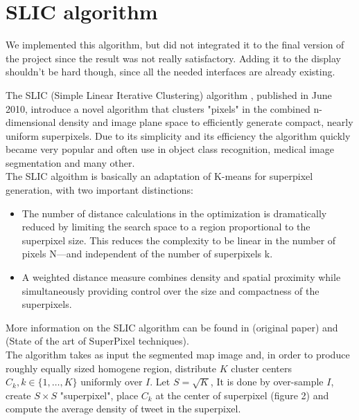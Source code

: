\section{ SLIC algorithm}
\label{sec:K-M_clustering}

We implemented this algorithm, but did not integrated it to the final version of the project since the result was not really satisfactory. Adding it to the display shouldn't be hard though, since all the needed interfaces are already existing. 

The SLIC (Simple Linear Iterative Clustering)  algorithm \cite{SLIC1}, published in June 2010, introduce a novel algorithm that clusters "pixels" in the combined n-dimensional density and image plane space to efficiently generate compact, nearly uniform superpixels. Due to its simplicity and its efficiency the algorithm quickly became very popular and often use in object class recognition, medical image segmentation and many other.\\

The SLIC algoithm is basically an adaptation of K-means for superpixel generation, with two important distinctions:

\begin{itemize}

\item The number of distance calculations in the optimization is dramatically reduced by limiting the search space to a region proportional to the superpixel size. This reduces the complexity to be linear in the number of pixels N—and independent of the number of superpixels k.

\item A weighted distance measure combines density and spatial proximity while simultaneously providing control over the size and compactness of the superpixels.

\end{itemize}

More information on the SLIC algorithm can be found in \cite{SLIC1} (original paper) and \cite{SLIC2} (State of the art of SuperPixel techniques).\\ 

The algorithm takes as input the segmented map image and, in order to produce roughly equally sized homogene region, distribute $K$ cluster centers $C_k, k \in \{1, \ldots, K \}$ uniformly over $I$. Let $S = \sqrt{K}$, It is done by over-sample $I$, create $S \times S$ "superpixel", place $C_k$ at the center of superpixel (figure 2) and compute the average density of tweet in the superpixel. 

